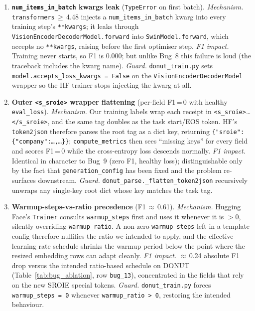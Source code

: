 \documentclass[conference]{IEEEtran}
\begin{document}
\begin{enumerate}
\item \textbf{\texttt{num\_items\_in\_batch} kwargs leak}
  (\texttt{TypeError} on first batch).
  \textit{Mechanism.} \texttt{transformers}\,$\geq$\,4.48 injects a
  \texttt{num\_items\_in\_batch} kwarg into every training step's
  \texttt{**kwargs}; it leaks through
  \texttt{VisionEncoderDecoderModel.forward} into
  \texttt{SwinModel.forward}, which accepts no \texttt{**kwargs},
  raising before the first optimiser step.  \textit{F1 impact.}
  Training never starts, so F1 is 0.000; but unlike Bug~8 this
  failure is loud (the traceback includes the kwarg name).
  \textit{Guard.} \texttt{donut\_train.py} sets
  \texttt{model.accepts\_loss\_kwargs = False} on the
  \texttt{VisionEncoderDecoderModel} wrapper so the HF trainer stops
  injecting the kwarg at all.

\item \textbf{Outer \texttt{<s\_sroie>} wrapper flattening}
  (per-field F1\,=\,0 with healthy \texttt{eval\_loss}).
  \textit{Mechanism.} Our training labels wrap each receipt in
  \texttt{<s\_sroie>}\ldots\texttt{</s\_sroie>}, and the same tag
  doubles as the task start/EOS token.  HF's \texttt{token2json}
  therefore parses the root tag as a dict key, returning
  \texttt{\{"sroie":\{"company":\ldots,\ldots\}\}};
  \texttt{compute\_metrics} then sees ``missing keys'' for every
  field and scores F1\,=\,0 while the cross-entropy loss descends
  normally.  \textit{F1 impact.} Identical in character to Bug~9
  (zero F1, healthy loss); distinguishable only by the fact that
  \texttt{generation\_config} has been fixed and the problem
  re-surfaces downstream.  \textit{Guard.}
  \texttt{donut\_parse.\_flatten\_token2json} recursively unwraps
  any single-key root dict whose key matches the task tag.

\item \textbf{Warmup-steps-vs-ratio precedence} (F1\,$\approx$\,0.61).
  \textit{Mechanism.} Hugging Face's \texttt{Trainer} consults
  \texttt{warmup\_steps} first and uses it whenever it is $>$0,
  silently overriding \texttt{warmup\_ratio}.  A non-zero
  \texttt{warmup\_steps} left in a template config therefore
  nullifies the ratio we intended to apply, and the effective
  learning rate schedule shrinks the warmup period below the point
  where the resized embedding rows can adapt cleanly.
  \textit{F1 impact.} $\approx$\,0.24 absolute F1 drop versus the
  intended ratio-based schedule on DONUT (Table~\ref{tab:bug_ablation},
  row \texttt{bug\_13}), concentrated in the
  fields that rely on the new SROIE special tokens.
  \textit{Guard.} \texttt{donut\_train.py} forces
  \texttt{warmup\_steps\,=\,0} whenever
  \texttt{warmup\_ratio\,>\,0}, restoring the intended behaviour.


\end{enumerate}
\fussy
\end{document}
